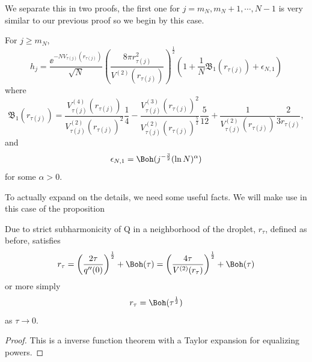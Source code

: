We separate this in two proofs, the first one for $j = m_N, m_N + 1, \cdots, N-1$  is very similar to our previous proof so we begin by this case.

\begin{teorema}
	For $j \geq m_N$,
	\begin{equation}
		h_j =  \frac{\ee^{-N V_{\tau(j)}(r_{\tau(j)})}}{\sqrt{N}} \left( \frac{8\pi r^2_{\tau(j)}}{V^{(2)}(r_{\tau(j)})} \right)^{\frac{1}{2}} \left( 1 + \frac{1}{N} \mathfrak{B}_1(r_{\tau(j)}) + \epsilon_{N, 1} \right) 
	\end{equation}
	where
	\begin{equation}
		\mathfrak{B}_1(r_{\tau(j)})  = \frac{V^{(4)}_{\tau(j)}(r_{\tau(j)})}{V^{(2)}_{\tau(j)}(r_{\tau(j)})^2} \frac{1}{4} - \frac{V^{(3)}_{\tau(j)}(r_{\tau(j)})^2}{V^{(2)}_{\tau(j)}(r_{\tau(j)})^{\frac{5}{2}}} \frac{5}{12} + \frac{1}{V^{(2)}_{\tau(j)}(r_{\tau(j)})} \frac{2}{3 r_{\tau(j)}},
	\end{equation}
	and
	\begin{equation}
		\epsilon_{N, 1} =  \Boh(j^{-\frac{3}{2}} (\ln N)^\alpha)
	\end{equation}
	for some $\alpha > 0$.
	\label{Theorem: hj disk j>mn}
\end{teorema}

To actually expand on the details, we need some useful facts. We will make use in this case of the proposition

\begin{proposicao}
	Due to strict subharmonicity of Q in a neighborhood of the droplet, $r_\tau$, defined as before, satisfies 
	\begin{equation}
		r_\tau = \left( \frac{2\tau}{q''(0)} \right)^{\frac{1}{2}} + \Boh(\tau) = \left( \frac{4\tau}{V^{(2)}(r_\tau)} \right)^{\frac{1}{2}} + \Boh(\tau) 
	\end{equation}
	or more simply
	\begin{equation}
		r_\tau = \Boh (\tau^{\frac{1}{2}})
	\end{equation}
	as $\tau \rightarrow 0$.
	\label{Proposition: Behavior rt}
\end{proposicao}
\begin{proof}
	This is a inverse function theorem with a Taylor expansion for equalizing powers.
\end{proof}

